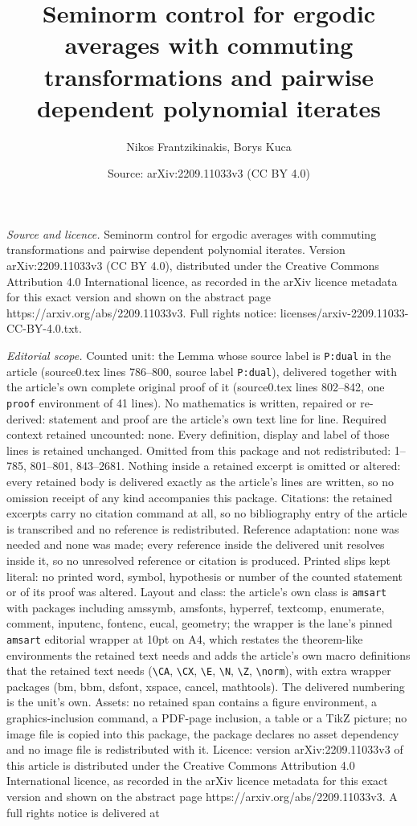 \documentclass[10pt,a4paper]{amsart}
\title[Seminorm control for ergodic averages with commuting transfo]{Seminorm control for ergodic averages with commuting transformations and pairwise dependent polynomial iterates}
\author{Nikos Frantzikinakis, Borys Kuca}
\date{Source: arXiv:2209.11033v3 (CC BY 4.0)}
\begin{document}
\maketitle

\noindent\emph{Source and licence.} Seminorm control for ergodic averages with commuting transformations and pairwise dependent polynomial iterates. Version arXiv:2209.11033v3 (CC BY 4.0), distributed under the Creative Commons Attribution 4.0 International licence, as recorded in the arXiv licence metadata for this exact version and shown on the abstract page https://arxiv.org/abs/2209.11033v3. Full rights notice: licenses/arxiv-2209.11033-CC-BY-4.0.txt.\par\smallskip

\noindent\textit{Editorial scope.} Counted unit: the Lemma whose source label is \texttt{P:dual} in the article (source0.tex lines 786--800, source label \texttt{P:dual}), delivered together with the article's own complete original proof of it (source0.tex lines 802--842, one \texttt{proof} environment of 41 lines). No mathematics is written, repaired or re-derived: statement and proof are the article's own text line for line. Required context retained uncounted: none. Every definition, display and label of those lines is retained unchanged. Omitted from this package and not redistributed: 1--785, 801--801, 843--2681. Nothing inside a retained excerpt is omitted or altered: every retained body is delivered exactly as the article's lines are written, so no omission receipt of any kind accompanies this package. Citations: the retained excerpts carry no citation command at all, so no bibliography entry of the article is transcribed and no reference is redistributed. Reference adaptation: none was needed and none was made; every reference inside the delivered unit resolves inside it, so no unresolved reference or citation is produced. Printed slips kept literal: no printed word, symbol, hypothesis or number of the counted statement or of its proof was altered. Layout and class: the article's own class is \texttt{amsart} with packages including amssymb, amsfonts, hyperref, textcomp, enumerate, comment, inputenc, fontenc, eucal, geometry; the wrapper is the lane's pinned \texttt{amsart} editorial wrapper at 10pt on A4, which restates the theorem-like environments the retained text needs and adds the article's own macro definitions that the retained text needs (\texttt{\textbackslash CA}, \texttt{\textbackslash CX}, \texttt{\textbackslash E}, \texttt{\textbackslash N}, \texttt{\textbackslash Z}, \texttt{\textbackslash norm}), with extra wrapper packages (bm, bbm, dsfont, xspace, cancel, mathtools). The delivered numbering is the unit's own. Assets: no retained span contains a figure environment, a graphics-inclusion command, a PDF-page inclusion, a table or a TikZ picture; no image file is copied into this package, the package declares no asset dependency and no image file is redistributed with it. Licence: version arXiv:2209.11033v3 of this article is distributed under the Creative Commons Attribution 4.0 International licence, as recorded in the arXiv licence metadata for this exact version and shown on the abstract page https://arxiv.org/abs/2209.11033v3. A full rights notice is delivered at 
\end{document}
